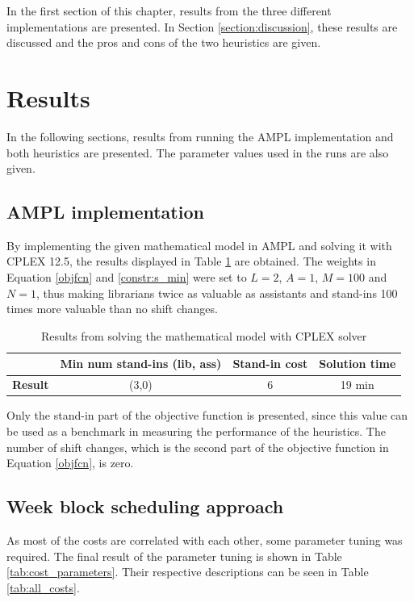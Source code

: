 In the first section of this chapter, results from the three different implementations are presented. In Section \ref{section:discussion}, these results are discussed and the pros and cons of the two heuristics are given.


\section{Results} \label{section:results}
In the following sections, results from running the AMPL implementation and both heuristics are presented. The parameter values used in the runs are also given. 

\subsection{AMPL implementation}\label{sec:ampl_res}

By implementing the given mathematical model in AMPL and solving it with CPLEX 12.5, the results displayed in Table \ref{tab:CPLEX_res} are obtained. The weights in Equation \ref{objfcn} and \ref{constr:s_min} were set to $L = 2$, $A = 1$, $M =100$ and $N=1$, thus making librarians twice as valuable as assistants and stand-ins 100 times more valuable than no shift changes. 

\begin{table}[!h]
\centering
\caption{Results from solving the mathematical model with CPLEX solver}
\label{tab:CPLEX_res}
\begin{tabular}{|l|p{3cm}|p{3cm}|l|}
\hline
\rowcolor{Gray} & \textbf{Min num stand-ins (lib, ass)} & \textbf{Stand-in cost} & \textbf{Solution time} \\ \hline
\cellcolor{Gray} \textbf{Result} & \multicolumn{1}{c|}{(3,0)} & \multicolumn{1}{c|}{6} & \multicolumn{1}{c|}{19 min} \\
\hline
\end{tabular}
\end{table}

Only the stand-in part of the objective function is presented, since this value can be used as a benchmark in measuring the performance of the heuristics. The number of shift changes, which is the second part of the objective function in Equation \ref{objfcn}, is zero.

\subsection{Week block scheduling approach}
As most of the costs are correlated with each other, some parameter tuning was required. The final result of the parameter tuning is shown in Table \ref{tab:cost_parameters}. Their respective descriptions can be seen in Table \ref{tab:all_costs}. 

